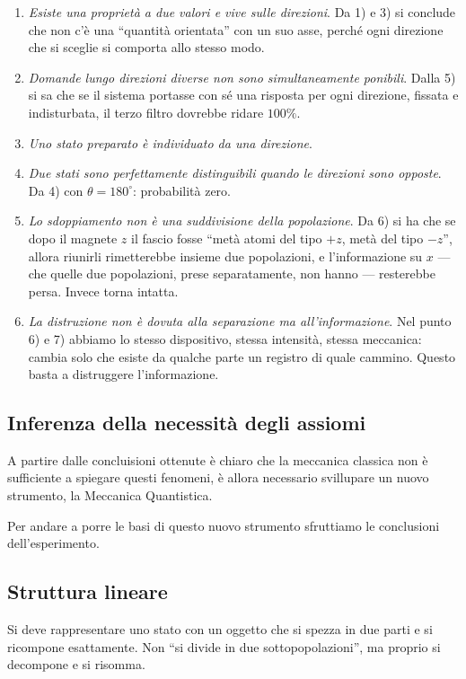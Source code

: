 \begin{enumerate}[label =\Roman*]
  \item \emph{Esiste una proprietà a due valori e vive sulle direzioni}. Da 1) e 3) si conclude che non c’è una “quantità orientata” con un suo asse, perché ogni direzione che si sceglie si comporta allo stesso modo.
  \item \emph{Domande lungo direzioni diverse non sono simultaneamente ponibili}. Dalla 5) si sa che se il sistema portasse con sé una risposta per ogni direzione, fissata e indisturbata, il terzo filtro dovrebbe ridare $100\%$.
  \item \emph{Uno stato preparato è individuato da una direzione}. 
  \item \emph{Due stati sono perfettamente distinguibili quando le direzioni sono opposte}. Da 4) con $\theta=180^{\circ}$: probabilità zero.
  \item \emph{Lo sdoppiamento non è una suddivisione della popolazione}. Da 6) si ha che se dopo il magnete $z$ il fascio fosse “metà atomi del tipo $+z$, metà del tipo $-z$”, allora riunirli rimetterebbe insieme due popolazioni, e l’informazione su $x$ — che quelle due popolazioni, prese separatamente, non hanno — resterebbe persa. Invece torna intatta.
  \item \emph{La distruzione non è dovuta alla separazione ma all'informazione}. Nel punto 6) e 7) abbiamo lo stesso dispositivo, stessa intensità, stessa meccanica: cambia solo che esiste da qualche parte un registro di quale cammino. Questo basta a distruggere l'informazione. 
\end{enumerate}

\subsection{Inferenza della necessità degli assiomi}

A partire dalle concluisioni ottenute è chiaro che la meccanica classica non è sufficiente a spiegare questi fenomeni, è allora necessario svillupare un nuovo strumento, la Meccanica Quantistica.

Per andare a porre le basi di questo nuovo strumento sfruttiamo le conclusioni dell'esperimento. 

\subsection*{Struttura lineare}

Si deve rappresentare uno stato con un oggetto che si spezza in due parti e si ricompone esattamente. Non “si divide in due sottopopolazioni”, ma proprio si decompone e si risomma.

